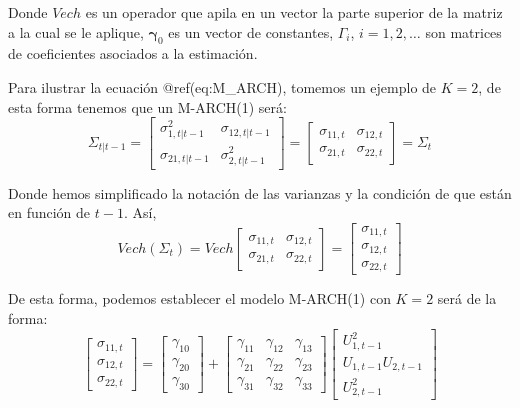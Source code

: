 \documentclass[
]{book}
\begin{document}
Donde \(Vech\) es un operador que apila en un vector la parte superior de la matriz a la cual se le aplique, \(\boldsymbol{\gamma}_0\) es un vector de constantes, \(\Gamma_i\), \(i = 1, 2, \ldots\) son matrices de coeficientes asociados a la estimación.

Para ilustrar la ecuación @ref(eq:M\_ARCH), tomemos un ejemplo de \(K = 2\), de esta forma tenemos que un M-ARCH(1) será:
\begin{equation*}
    \Sigma_{t | t-1} = 
    \begin{bmatrix}
    \sigma^2_{1, t | t-1} & \sigma_{12, t | t-1} \\ \sigma_{21, t | t-1} & \sigma^2_{2, t | t-1}
    \end{bmatrix} = 
    \begin{bmatrix}
    \sigma_{11, t} & \sigma_{12, t} \\ \sigma_{21, t} & \sigma_{22, t}
    \end{bmatrix} =
    \Sigma_{t}
\end{equation*}

Donde hemos simplificado la notación de las varianzas y la condición de que están en función de \(t-1\). Así,
\begin{equation*}
    Vech(\Sigma_{t}) = 
    Vech \begin{bmatrix}
    \sigma_{11, t} & \sigma_{12, t} \\ \sigma_{21, t} & \sigma_{22, t}
    \end{bmatrix} =
    \begin{bmatrix}
    \sigma_{11, t} \\ \sigma_{12, t} \\ \sigma_{22, t}
    \end{bmatrix}
\end{equation*}

De esta forma, podemos establecer el modelo M-ARCH(1) con \(K = 2\) será de la forma:
\begin{equation*}
    \begin{bmatrix}
    \sigma_{11, t} \\ \sigma_{12, t} \\ \sigma_{22, t}
    \end{bmatrix} =
    \begin{bmatrix}
    \gamma_{10} \\ \gamma_{20} \\ \gamma_{30}
    \end{bmatrix} +
    \begin{bmatrix}
    \gamma_{11} & \gamma_{12} & \gamma_{13} \\ \gamma_{21} & \gamma_{22} & \gamma_{23} \\ \gamma_{31} & \gamma_{32} & \gamma_{33}
    \end{bmatrix} 
    \begin{bmatrix}
    U^2_{1, t-1} \\ U_{1, t-1} U_{2, t-1} \\ U^2_{2, t-1}
    \end{bmatrix}
\end{equation*}
\end{document}
